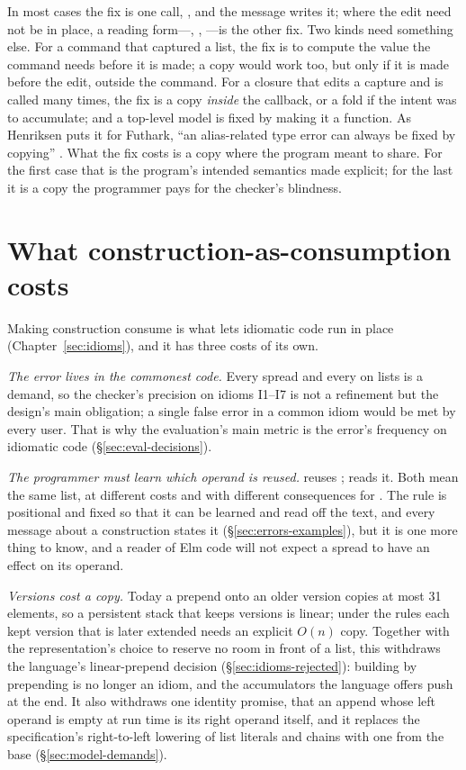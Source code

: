 In most cases the fix is one call, , and the message writes it; where the edit need not
be in place, a reading form---, , ---is the other fix.
Two kinds need something else. For a command that captured a list, the fix is to compute the value the
command needs before it is made; a copy would work too, but only if it is made before the edit, outside the
command. For a closure that edits a capture and is called many times, the fix is a copy \emph{inside} the
callback, or a fold if the intent was to accumulate; and a top-level model is fixed by making it a
function. As Henriksen puts it for Futhark, ``an
alias-related type error can always be fixed by copying'' \citep{henriksen2022uniqueness}. What the fix
costs is a copy where the program meant to share. For the first case that is the program's intended
semantics made explicit; for the last it is a copy the programmer pays for the checker's blindness.

\section{What construction-as-consumption costs}
\label{sec:disc-copy}

Making construction consume is what lets idiomatic code run in place (Chapter~\ref{sec:idioms}), and it
has three costs of its own.

\emph{The error lives in the commonest code.} Every spread and every \code{++} on lists is a demand, so the
checker's precision on idioms I1--I7 is not a refinement but the design's main obligation; a single
false error in a common idiom would be met by every user. That is why the evaluation's main metric is the
error's frequency on idiomatic code (\S\ref{sec:eval-decisions}).

\emph{The programmer must learn which operand is reused.} \code{[ x, …ys ]} reuses ;
 reads it. Both mean the same list, at different costs and with different consequences
for . The rule is positional and fixed so that it can be learned and read off the text, and
every message about a construction states it (\S\ref{sec:errors-examples}), but it is one more thing to
know, and a reader of Elm code will not expect a spread to have an effect on its operand.

\emph{Versions cost a copy.} Today a prepend onto an older version copies at most 31 elements, so a
persistent stack that keeps versions is linear; under the rules each kept version that is later extended
needs an explicit $O(n)$ copy. Together with the representation's choice to reserve no room in front of
a list, this withdraws the language's linear-prepend decision (\S\ref{sec:idioms-rejected}): building by
prepending is no longer an idiom, and the accumulators the language offers push at the end. It also withdraws one identity promise, that an
append whose left operand is empty at run time is its right operand itself, and it replaces the
specification's right-to-left lowering of list literals and \code{++} chains with one from the base
(\S\ref{sec:model-demands}).

